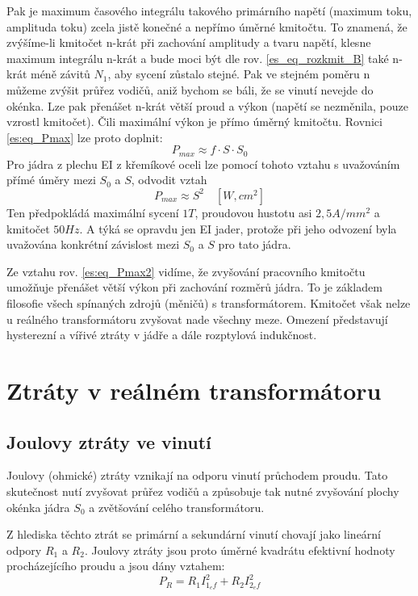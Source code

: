       Pak je maximum časového integrálu takového primárního napětí (maximum toku, amplituda toku) zcela jistě 
      konečné a nepřímo úměrné kmitočtu. To znamená, že zvýšíme-li kmitočet n-krát při zachování amplitudy a 
      tvaru napětí, klesne maximum integrálu n-krát a bude moci být dle rov. \ref{es_eq_rozkmit_B} také 
      n-krát méně závitů $N_1$, aby sycení zůstalo stejné. Pak ve stejném poměru n můžeme zvýšit průřez 
      vodičů, aniž bychom se báli, že se vinutí nevejde do okénka. Lze pak přenášet n-krát větší proud a 
      výkon (napětí se nezměnila, pouze vzrostl kmitočet). Čili maximální výkon je přímo úměrný kmitočtu. 
      Rovnici \ref{es:eq_Pmax} lze proto doplnit:
      \begin{equation}\label{es:eq_Pmax2}
        P_{max} \approx f\cdot S\cdot S_0
      \end{equation}
      Pro jádra z plechu EI z křemíkové oceli lze pomocí tohoto vztahu s uvažováním přímé úměry mezi $S_0$ a 
      $S$, odvodit vztah
      \begin{equation}\label{es:eq_Pmax_EI}
        P_{max} \approx S^2\quad [W, cm^2]
      \end{equation}
      Ten předpokládá maximální sycení $1 T$, proudovou hustotu asi $2,5 A/mm^2$ a kmitočet $50 Hz$. A týká 
      se opravdu jen EI jader, protože při jeho odvození byla uvažována konkrétní závislost mezi $S_0$ a $S$ 
      pro tato jádra.

      Ze vztahu rov. \ref{es:eq_Pmax2} vidíme, že zvyšování pracovního kmitočtu umožňuje přenášet větší výkon 
      při zachování rozměrů jádra. To je základem filosofie všech spínaných zdrojů (měničů) s 
      transformátorem. Kmitočet však nelze u reálného transformátoru zvyšovat nade všechny meze. Omezení 
      představují hysterezní a vířivé ztráty v jádře a dále rozptylová indukčnost.

  \section{Ztráty v reálném transformátoru}
    \subsection{Joulovy ztráty ve vinutí}
      Joulovy (ohmické) ztráty vznikají na odporu vinutí průchodem proudu. Tato sku\-te\-čnost nutí zvyšovat 
      průřez vodičů a způsobuje tak nutné zvyšování plochy okénka jádra $S_0$ a zvětšování celého 
      transformátoru.

      Z hlediska těchto ztrát se primární a sekundární vinutí chovají jako lineární odpory $R_1$ a $R_2$. 
      Joulovy ztráty jsou proto úměrné kvadrátu efektivní hodnoty procházejícího proudu a jsou dány vztahem:
      \begin{equation}\label{es_joul_loss}
        P_R= R_1 I_{1_ef}^2 + R_2 I_{2_ef}^2
      \end{equation}

